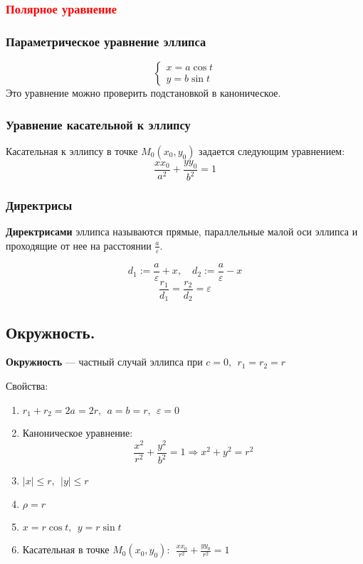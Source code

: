 \subsubsection{\textcolor{red}{Полярное уравнение}}

\subsubsection{Параметрическое уравнение эллипса}
$$\begin{cases}
    x=a\cos t \\
    y=b\sin t
\end{cases}$$
Это уравнение можно проверить подстановкой в каноническое.

\subsubsection{Уравнение касательной к эллипсу}
Касательная к эллипсу в точке $M_0(x_0,y_0)$ задается следующим уравнением:
$$\frac{xx_0}{a^2}+\frac{yy_0}{b^2}=1$$

\subsubsection{Директрисы}
\begin{definition}
    \textbf{Директрисами} эллипса называются прямые, параллельные малой оси эллипса и проходящие от нее на расстоянии $\frac{a}{\varepsilon}$.
\end{definition}
$$d_1:=\frac{a}{\varepsilon}+x,\quad d_2:=\frac{a}{\varepsilon}-x$$
$$\frac{r_1}{d_1}=\frac{r_2}{d_2}=\varepsilon$$

\subsection{Окружность.}
\begin{definition}
    \textbf{Окружность} --- частный случай эллипса при $c=0,\ \  r_1=r_2=r$
\end{definition}
Свойства:
\begin{enumerate}
    \item $r_1+r_2=2a=2r, \ \ a=b=r, \ \ \varepsilon=0$
    \item Каноническое уравнение:
    $$\frac{x^2}{r^2}+\frac{y^2}{b^2}=1\Rightarrow x^2+y^2=r^2$$
    \item $|x|\leq r, \ \ |y|\leq r$
    \item $\rho =r$
    \item $x=r\cos t, \ \ y=r\sin t$
    \item Касательная в точке $M_0(x_0, y_0):\ \ \frac{xx_0}{r^2}+\frac{yy_0}{r^2}=1$
\end{enumerate}

